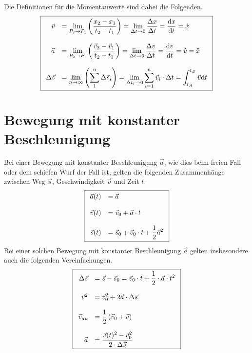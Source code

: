 \noindent
Die Definitionen für die Momentanwerte sind dabei die Folgenden.
\[\boxed{\begin{array}{r l}
	\vec{v}	&
		= \displaystyle \lim\limits_{P_2 \rightarrow P_1} 
			{\left( \frac{x_2 - x_1}{t_2 - t_1} \right)}
		= \displaystyle \lim\limits_{\Delta t \rightarrow 0}
			{\frac{\Delta x}{\Delta t}}
		= \displaystyle \frac{\mathrm{d}x}{\mathrm{d}t}=\dot{x} \\
	& \\
	\vec{a} &
		= \displaystyle \lim\limits_{P_2 \rightarrow P_1}
			{\left( \frac{\vec{v}_2 
			- \vec{v}_1}{t_2 - t_1} \right)}
		= \displaystyle \lim\limits_{\Delta t \rightarrow 0}
			{\frac{\Delta v}{\Delta t}}
		= \displaystyle \frac{\mathrm{d}v}{\mathrm{d}t}
		= \displaystyle \dot{v}
		= \ddot{x} \\
	& \\
	\Delta \vec{s} &
		= \displaystyle \lim\limits_{n \rightarrow \infty}
			{\left( \sum_{1}^{n} \Delta \vec{s}_i \right)}
		= \displaystyle \lim\limits_{\Delta t_i \rightarrow 0}
			{\sum^{n}_{i=1}\vec{v}_i\cdot\Delta t}
		= \displaystyle \int_{t_A}^{t_B}\vec{v}\mathrm{d}t
\end{array}}\]

\section{Bewegung mit konstanter Beschleunigung}
Bei einer Bewegung mit konstanter Beschleunigung $\vec{a}$, wie dies beim
freien Fall oder dem schiefen Wurf der Fall ist, gelten die folgenden
Zusammenhänge zwischen Weg $\vec{s}$, Geschwindigkeit $\vec{v}$ und 
Zeit $t$.
\[ \boxed{\begin{array}{r l} 
	\vec{a}(t) 	&= \displaystyle
		\vec{a} \\
	& \\
	\vec{v}(t)	&= \displaystyle 
		\vec{v}_0+\vec{a}\cdot t \\
	& \\
	\vec{s}(t) 	&= \displaystyle 
		\vec{s}_0+\vec{v}_0\cdot t+\frac{1}{2}\vec{a}^{2}
\end{array}}\]
Bei einer solchen Bewegung mit konstanter Beschleunigung $\vec{a}$ gelten
insbesondere auch die folgenden Vereinfachungen.
\[ \boxed{\begin{array}{r l}
	\Delta \vec{s}	&= \displaystyle
		\vec{s}-\vec{s}_0 = \displaystyle
		\vec{v}_0\cdot t+\frac{1}{2}\cdot \vec{a}\cdot t^2 \\
	& \\
	\vec{v}^2 	&= \displaystyle
		\vec{v}_{0}^{2}+2\vec{a} \cdot \Delta \vec{s} \\
	& \\
	\vec{v}_{av} &= \displaystyle
		\frac{1}{2} \left( \vec{v}_0 + \vec{v} \right) \\
	& \\
	\vec{a} 	&= \displaystyle
		\frac{\vec{v}(t)^2-\vec{v}_0^2}{2\cdot\Delta \vec{s}} 
\end{array}}\]

